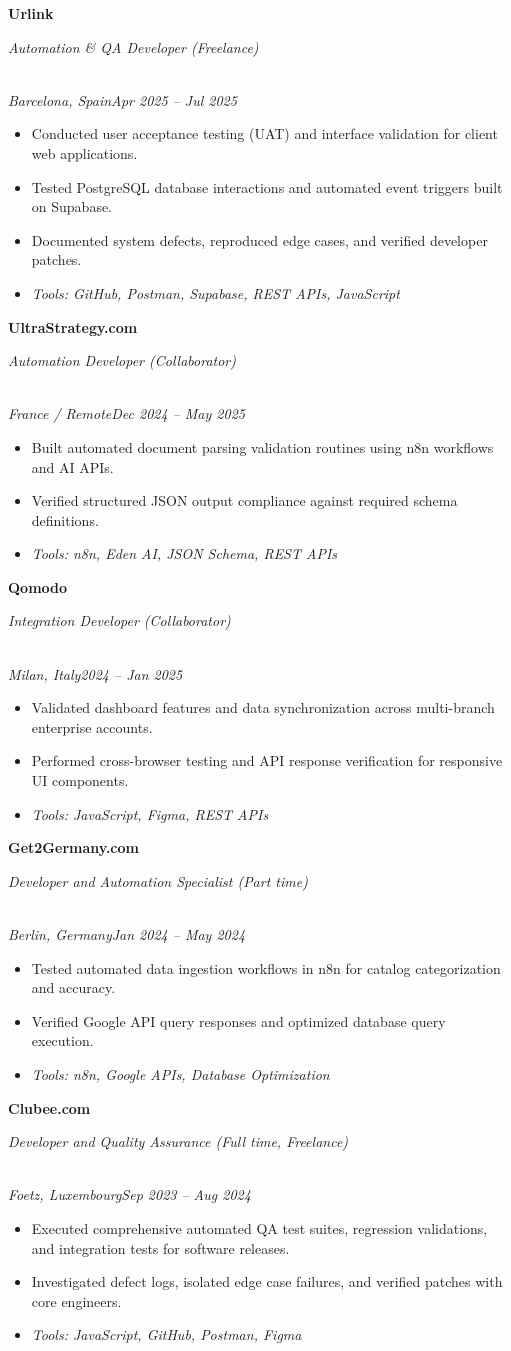 \documentclass[a4paper,10pt]{article}
\newcommand{\role}[4]{\vspace{3pt}\noindent\hspace{0.6em}\parbox[t]{0.38\textwidth}{\raggedright\textbf{#1}}\hfill\parbox[t]{0.58\textwidth}{\raggedleft\textit{#2}}\\{\textit{#3}\hfill\textit{#4}}\vspace{1pt}}
\begin{document}
\role{Urlink}{Automation \& QA Developer (Freelance)}{Barcelona, Spain}{Apr 2025 -- Jul 2025}
\begin{itemize}
\item Conducted user acceptance testing (UAT) and interface validation for client web applications.
\item Tested PostgreSQL database interactions and automated event triggers built on Supabase.
\item Documented system defects, reproduced edge cases, and verified developer patches.
\item \textit{Tools: GitHub, Postman, Supabase, REST APIs, JavaScript}
\end{itemize}

\role{UltraStrategy.com}{Automation Developer (Collaborator)}{France / Remote}{Dec 2024 -- May 2025}
\begin{itemize}
\item Built automated document parsing validation routines using n8n workflows and AI APIs.
\item Verified structured JSON output compliance against required schema definitions.
\item \textit{Tools: n8n, Eden AI, JSON Schema, REST APIs}
\end{itemize}

\role{Qomodo}{Integration Developer (Collaborator)}{Milan, Italy}{2024 -- Jan 2025}
\begin{itemize}
\item Validated dashboard features and data synchronization across multi-branch enterprise accounts.
\item Performed cross-browser testing and API response verification for responsive UI components.
\item \textit{Tools: JavaScript, Figma, REST APIs}
\end{itemize}

\role{Get2Germany.com}{Developer and Automation Specialist (Part time)}{Berlin, Germany}{Jan 2024 -- May 2024}
\begin{itemize}
\item Tested automated data ingestion workflows in n8n for catalog categorization and accuracy.
\item Verified Google API query responses and optimized database query execution.
\item \textit{Tools: n8n, Google APIs, Database Optimization}
\end{itemize}

\role{Clubee.com}{Developer and Quality Assurance (Full time, Freelance)}{Foetz, Luxembourg}{Sep 2023 -- Aug 2024}
\begin{itemize}
\item Executed comprehensive automated QA test suites, regression validations, and integration tests for software releases.
\item Investigated defect logs, isolated edge case failures, and verified patches with core engineers.
\item \textit{Tools: JavaScript, GitHub, Postman, Figma}
\end{itemize}
\end{document}
